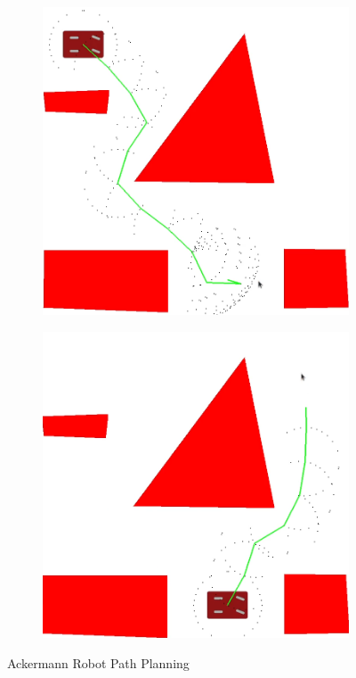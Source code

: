\documentclass{article}
\begin{document}
\begin{figure}[H]
    \centering
    \begin{subfigure}{0.4\textwidth}
        \centering
        \includegraphics[width = \textwidth]{imgs/path_ackermann_1.png}
    \end{subfigure}
    \begin{subfigure}{0.4\textwidth}
        \centering
        \includegraphics[width = \textwidth]{imgs/path_ackermann_2.png}
    \end{subfigure}
    \caption{Ackermann Robot Path Planning}
    \label{fig:ackermann-drive-path}
\end{figure}
\end{document}
